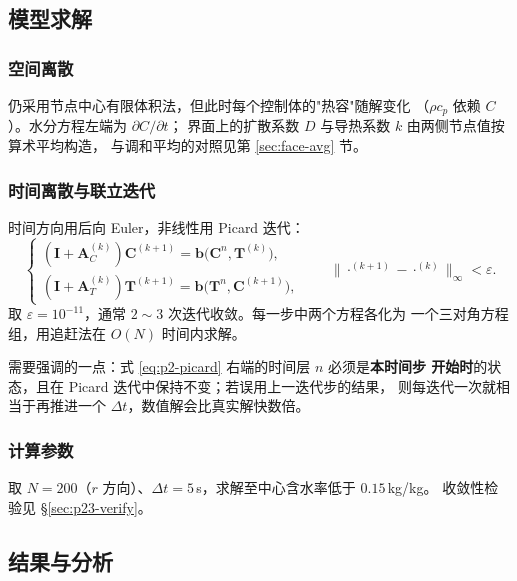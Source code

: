 \documentclass[12pt,a4paper,fontset=none]{ctexart}
\begin{document}
\subsection{模型求解}

\subsubsection{空间离散}

仍采用节点中心有限体积法，但此时每个控制体的"热容"随解变化
（$\rho c_p$ 依赖 $C$）。水分方程左端为 $\partial C/\partial t$；
界面上的扩散系数 $D$ 与导热系数 $k$ 由两侧节点值按算术平均构造，
与调和平均的对照见第 \ref{sec:face-avg} 节。

\subsubsection{时间离散与联立迭代}

时间方向用后向 Euler，非线性用 Picard 迭代：
\begin{equation}
  \begin{cases}
    \left(\bm{I}+\bm{A}_C^{(k)}\right)\bm{C}^{(k+1)}
      =\bm{b}\big(\bm{C}^{n},\bm{T}^{(k)}\big),\\[3pt]
    \left(\bm{I}+\bm{A}_T^{(k)}\right)\bm{T}^{(k+1)}
      =\bm{b}\big(\bm{T}^{n},\bm{C}^{(k+1)}\big),
  \end{cases}
  \qquad
  \big\|\cdot^{(k+1)}-\cdot^{(k)}\big\|_\infty<\varepsilon .
  \label{eq:p2-picard}
\end{equation}
取 $\varepsilon=10^{-11}$，通常 $2\sim3$ 次迭代收敛。每一步中两个方程各化为
一个三对角方程组，用追赶法在 $O(N)$ 时间内求解。

需要强调的一点：式 \eqref{eq:p2-picard} 右端的时间层 $n$ 必须是\textbf{本时间步
开始时}的状态，且在 Picard 迭代中保持不变；若误用上一迭代步的结果，
则每迭代一次就相当于再推进一个 $\Delta t$，数值解会比真实解快数倍。

\subsubsection{计算参数}

取 $N=200$（$r$ 方向）、$\Delta t=5$\,s，求解至中心含水率低于 $0.15$\,kg/kg。
收敛性检验见 §\ref{sec:p23-verify}。

\subsection{结果与分析}
\end{document}
